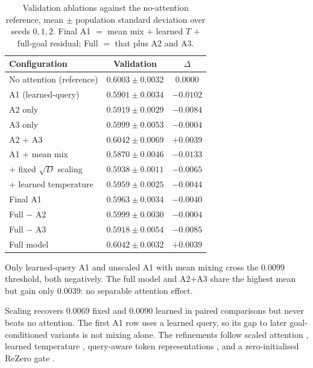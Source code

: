 \documentclass[11pt]{article}
\begin{document}
\begin{table}[tb]
  \centering\footnotesize
  \begin{tabular}{@{}lcc@{}}
    \toprule
    \textbf{Configuration} & \textbf{Validation} & \textbf{$\Delta$}\\
    \midrule
    No attention (reference) & $0.6003 \pm 0.0032$ & $0.0000$\\
    A1 (learned-query)       & $0.5901 \pm 0.0034$ & $-0.0102$\\
    A2 only                  & $0.5919 \pm 0.0029$ & $-0.0084$\\
    A3 only                  & $0.5999 \pm 0.0053$ & $-0.0004$\\
    A2 + A3                  & $0.6042 \pm 0.0069$ & $+0.0039$\\
    \midrule
    A1 + mean mix            & $0.5870 \pm 0.0046$ & $-0.0133$\\
    \;\;+ fixed $\sqrt{D}$ scaling & $0.5938 \pm 0.0011$ & $-0.0065$\\
    \;\;+ learned temperature      & $0.5959 \pm 0.0025$ & $-0.0044$\\
    Final A1                 & $0.5963 \pm 0.0034$ & $-0.0040$\\
    \midrule
    Full $-$ A2              & $0.5999 \pm 0.0030$ & $-0.0004$\\
    Full $-$ A3              & $0.5918 \pm 0.0054$ & $-0.0085$\\
    Full model               & $0.6042 \pm 0.0032$ & $+0.0039$\\
    \bottomrule
  \end{tabular}
  \caption{Validation ablations against the no-attention reference, mean $\pm$
  population standard deviation over seeds $0,1,2$. Final A1 $=$ mean mix $+$
  learned $T$ $+$ full-goal residual; Full $=$ that plus A2 and A3.}
  \label{tab:ablation}
\end{table}

Only learned-query A1 and unscaled A1 with mean mixing cross the $0.0099$
threshold, both negatively. The full model and A2$+$A3 share the highest mean
but gain only $0.0039$: no separable attention effect.

Scaling recovers $0.0069$ fixed and $0.0090$ learned in paired comparisons but
never beats no attention. The first A1 row uses a learned query, so its gap to
later goal-conditioned variants is not mixing alone. The refinements follow
scaled attention \citep{vaswani2017attention}, learned temperature
\citep{dufter2020temperature}, query-aware token representations
\citep{seo2017bidaf}, and a zero-initialised ReZero gate
\citep{bachlechner2021rezero}.
\end{document}
